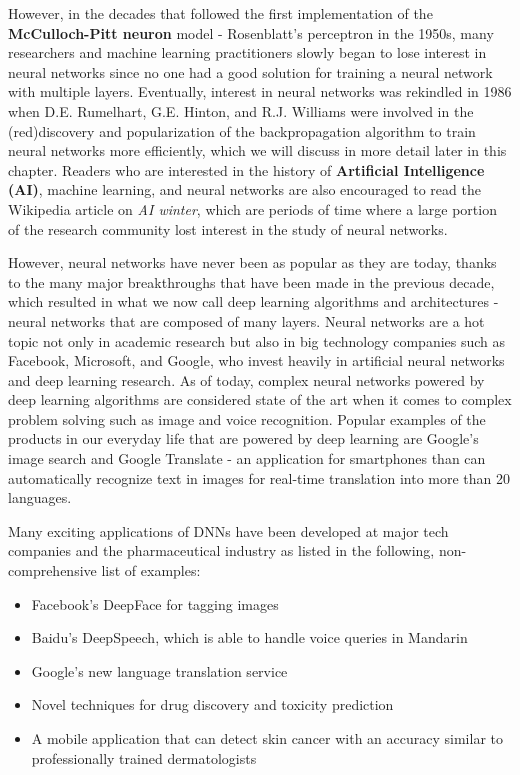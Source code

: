 \documentclass[11pt]{article}
\providecommand{\tightlist}{%
      \setlength{\itemsep}{0pt}\setlength{\parskip}{0pt}}
\begin{document}
However, in the decades that followed the first implementation of the
\textbf{McCulloch-Pitt neuron} model - Rosenblatt's perceptron in the
1950s, many researchers and machine learning practitioners slowly began
to lose interest in neural networks since no one had a good solution for
training a neural network with multiple layers. Eventually, interest in
neural networks was rekindled in 1986 when D.E. Rumelhart, G.E. Hinton,
and R.J. Williams were involved in the (red)discovery and popularization
of the backpropagation algorithm to train neural networks more
efficiently, which we will discuss in more detail later in this chapter.
Readers who are interested in the history of \textbf{Artificial
Intelligence (AI)}, machine learning, and neural networks are also
encouraged to read the Wikipedia article on \emph{AI winter}, which are
periods of time where a large portion of the research community lost
interest in the study of neural networks.

However, neural networks have never been as popular as they are today,
thanks to the many major breakthroughs that have been made in the
previous decade, which resulted in what we now call deep learning
algorithms and architectures - neural networks that are composed of many
layers. Neural networks are a hot topic not only in academic research
but also in big technology companies such as Facebook, Microsoft, and
Google, who invest heavily in artificial neural networks and deep
learning research. As of today, complex neural networks powered by deep
learning algorithms are considered state of the art when it comes to
complex problem solving such as image and voice recognition. Popular
examples of the products in our everyday life that are powered by deep
learning are Google's image search and Google Translate - an application
for smartphones than can automatically recognize text in images for
real-time translation into more than 20 languages.

Many exciting applications of DNNs have been developed at major tech
companies and the pharmaceutical industry as listed in the following,
non-comprehensive list of examples:

\begin{itemize}
\tightlist
\item
  Facebook's DeepFace for tagging images
\item
  Baidu's DeepSpeech, which is able to handle voice queries in Mandarin
\item
  Google's new language translation service
\item
  Novel techniques for drug discovery and toxicity prediction
\item
  A mobile application that can detect skin cancer with an accuracy
  similar to professionally trained dermatologists
\end{itemize}
\end{document}

